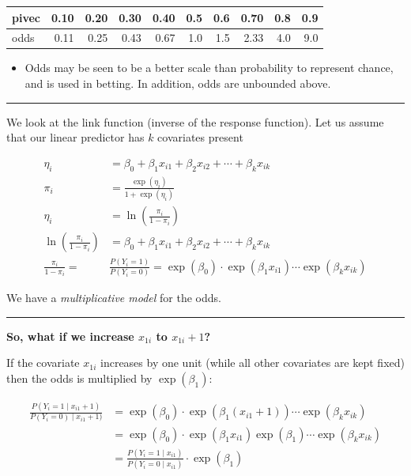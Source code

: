 \documentclass[
  letterpaper,
  DIV=11,
  numbers=noendperiod]{scrartcl}
\providecommand{\tightlist}{%
  \setlength{\itemsep}{0pt}\setlength{\parskip}{0pt}}\usepackage{longtable,booktabs,array}
\begin{document}
\begin{table}
\centering
\begin{tabular}{l|r|r|r|r|r|r|r|r|r}
\hline
pivec & 0.10 & 0.20 & 0.30 & 0.40 & 0.5 & 0.6 & 0.70 & 0.8 & 0.9\\
\hline
odds & 0.11 & 0.25 & 0.43 & 0.67 & 1.0 & 1.5 & 2.33 & 4.0 & 9.0\\
\hline
\end{tabular}
\end{table}

\begin{itemize}
\tightlist
\item
  Odds may be seen to be a better scale than probability to represent
  chance, and is used in betting. In addition, odds are unbounded above.
\end{itemize}

\begin{center}\rule{0.5\linewidth}{0.5pt}\end{center}

We look at the link function (inverse of the response function). Let us
assume that our linear predictor has \(k\) covariates present

\begin{align*}
\eta_i&= \beta_0+\beta_1 x_{i1}+\beta_2 x_{i2}+\cdots + \beta_k x_{ik}\\
\pi_i&= \frac{\exp(\eta_i)}{1+\exp(\eta_i)}\\
\eta_i&=\ln(\frac{\pi_i}{1-\pi_i})\\
\ln(\frac{\pi_i}{1-\pi_i})&=\beta_0+\beta_1 x_{i1}+\beta_2 x_{i2}+\cdots + \beta_k x_{ik}\\
\frac{\pi_i}{1-\pi_i}=&\frac{P(Y_i=1)}{P(Y_i=0)}=\exp(\beta_0)\cdot \exp(\beta_1 x_{i1})\cdots\exp(\beta_k x_{ik})
\end{align*}

We have a \emph{multiplicative model} for the odds.

\begin{center}\rule{0.5\linewidth}{0.5pt}\end{center}

\textbf{So, what if we increase \(x_{1i}\) to \(x_{1i}+1\)?}

If the covariate \(x_{1i}\) increases by one unit (while all other
covariates are kept fixed) then the odds is multiplied by
\(\exp(\beta_1)\):

\begin{align*}
\frac{P(Y_i=1\mid x_{i1}+1)}{P(Y_i=0)\mid x_{i1}+1)}&=\exp(\beta_0)\cdot \exp(\beta_1 (x_{i1}+1))\cdots\exp(\beta_k x_{ik})\\
&=\exp(\beta_0)\cdot \exp(\beta_1 x_{i1})\exp(\beta_1)\cdots\exp(\beta_k x_{ik})\\
&=\frac{P(Y_i=1\mid x_{i1})}{P(Y_i=0\mid x_{i1})}\cdot \exp(\beta_1)\\
\end{align*}
\end{document}
